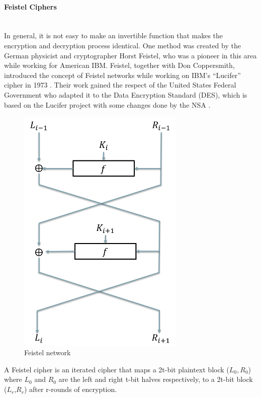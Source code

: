 \paragraph{Feistel Ciphers}\label{sec:feistel} \mbox{} \\
In general, it is not easy to make an invertible function that makes the encryption and decryption process identical. One method was created by the German physicist and cryptographer Horst Feistel, who was a pioneer in this area while working for American IBM. Feistel, together with Don Coppersmith, introduced the concept of Feistel networks while working on IBM's ``Lucifer'' cipher in 1973 \cite{feistel1973cryptography}. Their work gained the respect of the United States Federal Government who adapted it to the Data Encryption Standard (DES), which is based on the Lucifer project with some changes done by the NSA \cite{pub197746}.
\begin{figure}[h!]
	\centering
	\includegraphics[width=80mm]{./pics/myNetwork.png}
	\caption[Feistel network]{Feistel network}
	\label{Fig:FeistelNet}
\end{figure}
\begin{mydef}	
A Feistel cipher is an iterated cipher that maps a 2t-bit plaintext block ($L_{0},R_{0}$) where $L_{0}$ and $ R_{0}$ are the left and right t-bit halves respectively, to a 2t-bit block ($L_{r}$,$R_{r}$) after r-rounds of encryption.
\end{mydef}
